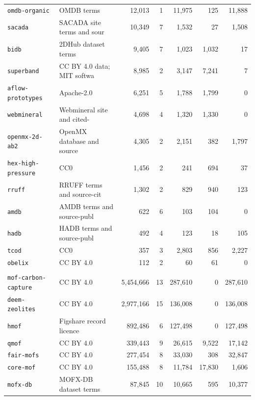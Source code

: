 \begin{table}[htbp]
\begin{tabular}{llrrrrr}
\quad \texttt{omdb-organic} & OMDB terms & 12{,}013 & 1 & 11{,}975 & 125 & 11{,}888 \\
\quad \texttt{sacada} & SACADA site terms and sour & 10{,}349 & 7 & 1{,}532 & 27 & 1{,}508 \\
\quad \texttt{bidb} & 2DHub dataset terms & 9{,}405 & 7 & 1{,}023 & 1{,}032 & 17 \\
\quad \texttt{superband} & CC BY 4.0 data; MIT softwa & 8{,}985 & 2 & 3{,}147 & 7{,}241 & 7 \\
\quad \texttt{aflow-prototypes} & Apache-2.0 & 6{,}251 & 5 & 1{,}788 & 1{,}799 & 0 \\
\quad \texttt{webmineral} & Webmineral site and cited- & 4{,}698 & 4 & 1{,}320 & 1{,}330 & 0 \\
\quad \texttt{openmx-2d-ab2} & OpenMX database and source & 4{,}305 & 2 & 2{,}151 & 382 & 1{,}797 \\
\quad \texttt{hex-high-pressure} & CC0 & 1{,}456 & 2 & 241 & 694 & 37 \\
\quad \texttt{rruff} & RRUFF terms and source-cit & 1{,}302 & 2 & 829 & 940 & 123 \\
\quad \texttt{amdb} & AMDB terms and source-publ & 622 & 6 & 103 & 104 & 0 \\
\quad \texttt{hadb} & HADB terms and source-publ & 492 & 4 & 123 & 18 & 105 \\
\quad \texttt{tcod} & CC0 & 357 & 3 & 2{,}803 & 856 & 2{,}227 \\
\quad \texttt{obelix} & CC BY 4.0 & 112 & 2 & 60 & 61 & 0 \\
\addlinespace[2pt]
\multicolumn{7}{l}{\textit{Porous and framework materials}} \\[1pt]
\quad \texttt{mof-carbon-capture} & CC BY 4.0 & 5{,}454{,}666 & 13 & 287{,}610 & 0 & 287{,}610 \\
\quad \texttt{deem-zeolites} & CC BY 4.0 & 2{,}977{,}166 & 15 & 136{,}008 & 0 & 136{,}008 \\
\quad \texttt{hmof} & Figshare record licence & 892{,}486 & 6 & 127{,}498 & 0 & 127{,}498 \\
\quad \texttt{qmof} & CC BY 4.0 & 339{,}443 & 9 & 26{,}615 & 9{,}522 & 17{,}142 \\
\quad \texttt{fair-mofs} & CC BY 4.0 & 277{,}454 & 8 & 33{,}030 & 308 & 32{,}847 \\
\quad \texttt{core-mof} & CC BY 4.0 & 155{,}488 & 8 & 11{,}784 & 17{,}830 & 1{,}606 \\
\quad \texttt{mofx-db} & MOFX-DB dataset terms & 87{,}845 & 10 & 10{,}665 & 595 & 10{,}377 \\

\end{tabular}
\end{table}
